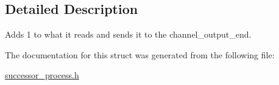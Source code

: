 \subsection{Detailed Description}
Adds 1 to what it reads and sends it to the channel\-\_\-output\-\_\-end. 

The documentation for this struct was generated from the following file\-:\begin{DoxyCompactItemize}
\item 
\hyperlink{successor__process_8h}{successor\-\_\-process.\-h}\end{DoxyCompactItemize}
